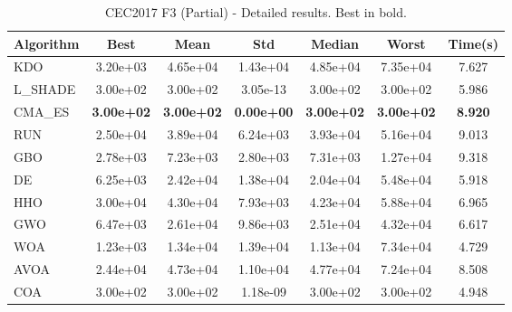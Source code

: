 \begin{table}[H]
\centering\small
\caption{CEC2017 F3 (Partial) - Detailed results. Best in bold.}
\label{tab:cec2017_F3}
\begin{tabular}{lcccccc}
\toprule
\textbf{Algorithm} & \textbf{Best} & \textbf{Mean} & \textbf{Std} & \textbf{Median} & \textbf{Worst} & \textbf{Time(s)} \\
\midrule
KDO & 3.20e+03 & 4.65e+04 & 1.43e+04 & 4.85e+04 & 7.35e+04 & 7.627 \\
L_SHADE & 3.00e+02 & 3.00e+02 & 3.05e-13 & 3.00e+02 & 3.00e+02 & 5.986 \\
CMA_ES & \textbf{3.00e+02} & \textbf{3.00e+02} & \textbf{0.00e+00} & \textbf{3.00e+02} & \textbf{3.00e+02} & \textbf{8.920} \\
RUN & 2.50e+04 & 3.89e+04 & 6.24e+03 & 3.93e+04 & 5.16e+04 & 9.013 \\
GBO & 2.78e+03 & 7.23e+03 & 2.80e+03 & 7.31e+03 & 1.27e+04 & 9.318 \\
DE & 6.25e+03 & 2.42e+04 & 1.38e+04 & 2.04e+04 & 5.48e+04 & 5.918 \\
HHO & 3.00e+04 & 4.30e+04 & 7.93e+03 & 4.23e+04 & 5.88e+04 & 6.965 \\
GWO & 6.47e+03 & 2.61e+04 & 9.86e+03 & 2.51e+04 & 4.32e+04 & 6.617 \\
WOA & 1.23e+03 & 1.34e+04 & 1.39e+04 & 1.13e+04 & 7.34e+04 & 4.729 \\
AVOA & 2.44e+04 & 4.73e+04 & 1.10e+04 & 4.77e+04 & 7.24e+04 & 8.508 \\
COA & 3.00e+02 & 3.00e+02 & 1.18e-09 & 3.00e+02 & 3.00e+02 & 4.948 \\
\bottomrule
\end{tabular}
\end{table}
